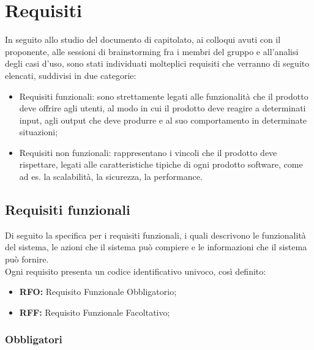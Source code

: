 \section{Requisiti}

In seguito allo studio del documento di capitolato, ai colloqui avuti con il proponente, alle sessioni di
brainstorming fra i membri del gruppo e all'analisi degli casi d'uso, sono stati individuati molteplici requisiti
che verranno di seguito elencati, suddivisi in due categorie:

\begin{itemize}
    \item Requisiti funzionali: sono strettamente legati alle funzionalità che il prodotto deve offrire agli utenti,
    al modo in cui il prodotto deve reagire a determinati input, agli output che deve produrre e al suo comportamento in determinate situazioni;
    \item Requisiti non funzionali: rappresentano i vincoli che il prodotto deve rispettare, legati alle caratteristiche tipiche di
    ogni prodotto software, come ad es. la scalabilità, la sicurezza, la performance.
\end{itemize}

\subsection{Requisiti funzionali}

Di seguito la specifica per i requisiti funzionali, i quali descrivono le funzionalità del sistema, le azioni che il sistema può compiere e le informazioni che il sistema può fornire.\\
Ogni requisito presenta un codice identificativo univoco, così definito:
\begin{itemize}
    \item \textbf{RFO:} Requisito Funzionale Obbligatorio;
    \item \textbf{RFF:} Requisito Funzionale Facoltativo;
\end{itemize}

\subsubsection{Obbligatori}

